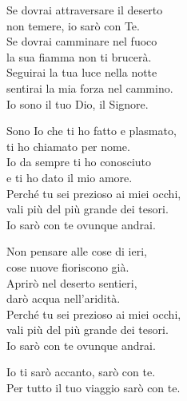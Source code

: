 
\strofa Se dovrai attraversare il deserto\\
non temere, io sarò con Te.\\
Se dovrai camminare nel fuoco\\
la sua fiamma non ti brucerà.\\
Seguirai la tua luce nella notte\\
sentirai la mia forza nel cammino.\\
Io sono il tuo Dio, il Signore.

\spazio

\strofa Sono Io che ti ho fatto e plasmato,\\
ti ho chiamato per nome.\\
Io da sempre ti ho conosciuto\\
e ti ho dato il mio amore.\\
Perché tu sei prezioso ai miei occhi,\\
vali più del più grande dei tesori.\\
Io sarò con te ovunque andrai.

\spazio

\strofa Non pensare alle cose di ieri,\\
cose nuove fioriscono già.\\
Aprirò nel deserto sentieri,\\
darò acqua nell'aridità.\\
Perché tu sei prezioso ai miei occhi,\\
vali più del più grande dei tesori.\\
Io sarò con te ovunque andrai.

\spazio

Io ti sarò accanto, sarò con te.\\
Per tutto il tuo viaggio sarò con te. 